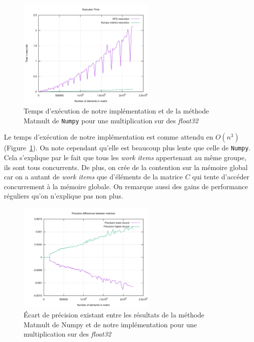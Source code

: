 \begin{figure}[H]
\begin{center}
    \includegraphics[width=0.6\textwidth]{../../resources/matrix_naive_execution_time.png}
    \caption{Temps d'exécution de notre implémentation et de la méthode Matmult de \texttt{Numpy}
    pour une multiplication sur des \textit{float32}}
    \label{fig:execution_time_naive}
\end{center}
\end{figure}

Le temps d'exécution de notre implémentation est comme attendu en $O(n^3)$ 
(Figure~\ref{fig:execution_time_naive}). On note cependant 
qu'elle est beaucoup plus lente que celle de \texttt{Numpy}. Cela s'explique 
par le fait que tous les \textit{work items} appertenant au même groupe, ils sont tous concurrents. 
De plus, on crée de la contention sur la mémoire global car on a autant de \textit{work items} que 
d'éléments de la matrice $C$ qui tente d'accéder concurrement à la mémoire globale. On remarque 
aussi des gains de performance réguliers qu'on n'explique pas non plus.

\begin{figure}[H]
\begin{center}
    \includegraphics[width=0.6\textwidth]{../../resources/matrix_naive_float_precision.png}
    \caption{Écart de précision existant entre les résultats de la méthode Matmult de Numpy 
    et de notre implémentation pour une multiplication sur des \textit{float32}}
    \label{fig:accuracy_naive}
\end{center}
\end{figure}

